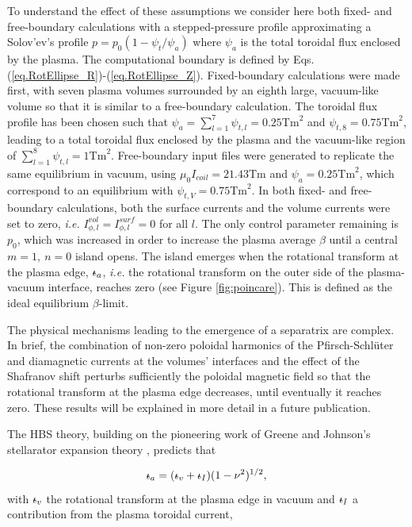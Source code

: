\documentclass[my_thesis.tex]{subfiles}
\begin{document}
To understand the effect of these assumptions we consider here both fixed- and free-boundary calculations with a stepped-pressure profile approximating a Solov'ev's profile $p = p_0(1-\psi_t / \psi_a)$ where $\psi_a$ is the total toroidal flux enclosed by the plasma. The computational boundary is defined by Eqs.(\ref{eq.RotEllipse_R})-(\ref{eq.RotEllipse_Z}). Fixed-boundary calculations were made first, with seven plasma volumes surrounded by an eighth large, vacuum-like volume so that it is similar to a free-boundary calculation. The toroidal flux profile has been chosen such that $\psi_a=\sum_{l=1}^7\psi_{t,l}=0.25\text{Tm}^2$ and $\psi_{t,8} = 0.75\text{Tm}^2$, leading to a total toroidal flux enclosed by the plasma and the vacuum-like region of $\sum_{l=1}^8\psi_{t,l} = 1\text{Tm}^2$. Free-boundary input files were generated to replicate the same equilibrium in vacuum, using $\mu_0I_{coil}=21.43$Tm and $\psi_a=0.25\text{Tm}^2$, which correspond to an equilibrium with $\psi_{t,V}=0.75\text{Tm}^2$. In both fixed- and free-boundary calculations, both the surface currents and the volume currents were set to zero, \textit{i.e.} $I_{\phi,l}^{vol} = I_{\phi,l}^{surf} = 0$ for all $l$. The only control parameter remaining is $p_0$, which was increased in order to increase the plasma average $\beta$ until a central $m=1,\ n=0$ island opens. The island emerges when the rotational transform at the plasma edge, $\text{$\iota\!\!$-}_a$, \textit{i.e.} the rotational transform on the outer side of the plasma-vacuum interface, reaches zero (see Figure \ref{fig:poincare}). This is defined as the ideal equilibrium $\beta$-limit. 

The physical mechanisms leading to the emergence of a separatrix are complex. In brief, the combination of non-zero poloidal harmonics of the Pfirsch-Schlüter and diamagnetic currents at the volumes' interfaces and the effect of the Shafranov shift perturbs sufficiently the poloidal magnetic field so that the rotational transform at the plasma edge decreases, until eventually it reaches zero. These results will be explained in more detail in a future publication.


The \ac{HBS} theory, building on the pioneering work of Greene and Johnson's stellarator expansion theory \citep{greeneDeterminationHydromagneticEquilibria1961}, predicts that

\begin{equation}
	\text{$\iota\!\!$-}_a = (\text{$\iota\!\!$-}_v + \text{$\iota\!\!$-}_I)(1-\nu^2)^{1/2},\label{eq.HBS_1}
\end{equation}
with $\text{$\iota\!\!$-}_v$ the rotational transform at the plasma edge in vacuum and $\text{$\iota\!\!$-}_I$ a contribution from the plasma toroidal current,
\end{document}

